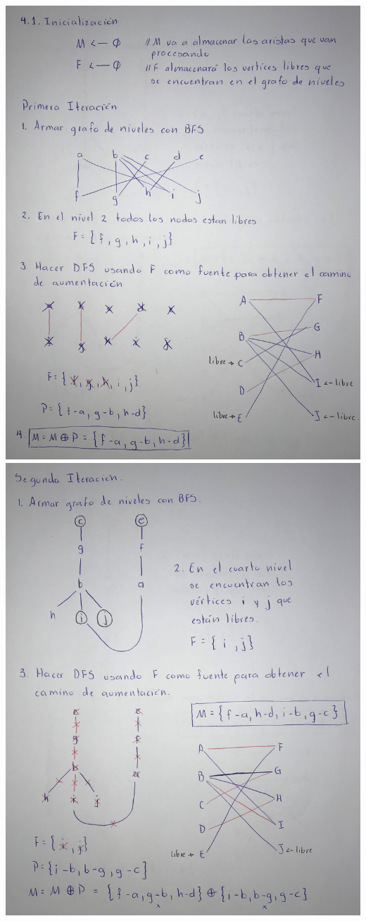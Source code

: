 \documentclass[12pt,a4paper]{article}
\begin{document}
\newpage
\centering
\includegraphics[width=\textwidth, height=\textheight,keepaspectratio]{images/ht1.jpg}
\newpage
\centering
\includegraphics[width=\textwidth, height=\textheight,keepaspectratio]{images/ht2.jpg}
\end{document}
